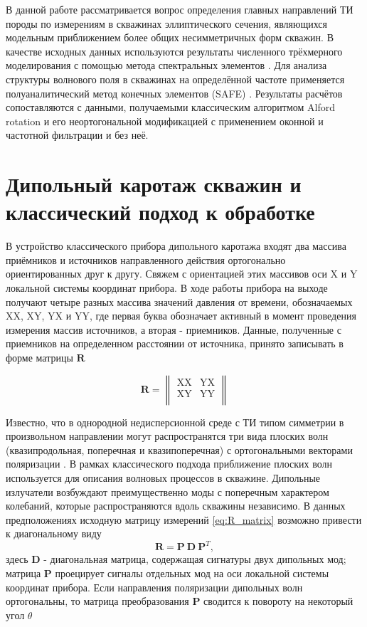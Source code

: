 \documentclass[a4paper,11pt]{article}
\begin{document}
В данной работе рассматривается вопрос определения главных направлений ТИ породы по измерениям в скважинах эллиптического сечения, являющихся модельным приближением более общих несимметричных форм скважин. В качестве исходных данных используются результаты численного трёхмерного моделирования с помощью метода спектральных элементов \cite{Komatitsch2000}. Для анализа структуры волнового поля в скважинах на определённой частоте применяется полуаналитический метод конечных элементов (SAFE) \cite{Bartoli2006}. Результаты расчётов сопоставляются с данными, получаемыми классическим алгоритмом Alford rotation \cite{Alford1986} и его неортогональной модификацией \cite{Dellinger1998} с применением оконной и частотной фильтрации и без неё.

\section{Дипольный каротаж скважин и классический подход к обработке}
В устройство классического прибора дипольного каротажа входят два массива приёмников и источников направленного действия ортогонально ориентированных друг к другу. Свяжем с ориентацией этих массивов оси X и Y локальной системы координат прибора. В ходе работы прибора на выходе получают четыре разных массива значений давления от времени, обозначаемых XX, XY, YX и YY, где первая буква обозначает активный в момент проведения измерения массив источников, а вторая - приемников. Данные, полученные с приемников на определенном расстоянии от источника, принято записывать в форме матрицы $\mathbf{R}$ 

\begin{equation}
	\mathbf{R} = \left\|
	\begin{array}{cc}
	\text{XX} & \text{YX} \\
	\text{XY} & \text{YY} \\
	\end{array}
	\right\| 
	\label{eq:R_matrix}
\end{equation}

Известно, что в однородной недисперсионной среде с ТИ типом симметрии в произвольном направлении могут распространятся три вида плоских волн (квазипродольная, поперечная и квазипоперечная) с ортогональными векторами поляризации \cite{Musgrave1970}. В рамках классического подхода приближение плоских волн используется для описания волновых процессов в скважине. Дипольные излучатели возбуждают преимущественно моды с поперечным характером колебаний, которые распространяются вдоль скважины независимо. В данных предположениях исходную матрицу измерений \eqref{eq:R_matrix} возможно привести к диагональному виду \cite{Dellinger1998}
\begin{equation}
	\mathbf{R} = \mathbf{P} \ \mathbf{D} \ \mathbf{P}^T, \label{eq:alford_symmetric} 
\end{equation}
здесь $\mathbf{D}$ - диагональная матрица, содержащая сигнатуры двух дипольных мод; матрица $\mathbf{P}$ проецирует сигналы отдельных мод на оси локальной системы координат прибора. Если направления поляризации дипольных волн ортогональны, то матрица преобразования $\mathbf{P}$ сводится к повороту на некоторый угол $\theta$
\end{document}
